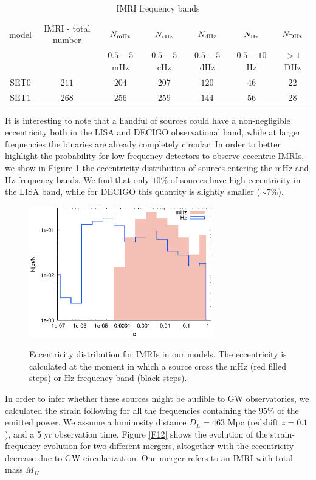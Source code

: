 \documentclass[useAMS,usenatbib]{mn2e}
\begin{document}
 \begin{table}
     \centering
     \caption{IMRI frequency bands}
     \begin{tabular}{ccccccc}
        \hline
        \hline
        model & IMRI - total number & $N_{\rm mHz}$ & $N_{\rm cHz}$ & $N_{\rm dHz}$ & $N_{\rm Hz}$ & $N_{\rm DHz}$ \\ 
              &                     &$0.5-5$ mHz    & $ 0.5-5$ cHz  &  $0.5-5$ dHz & $0.5-10$ Hz & $>1$ DHz \\
        \hline
        SET0 & $211$ & $204$ &  $207$ & $120$ & $46$ & $22$   \\
        SET1 & $268$ & $256$ &  $259$ & $144$ & $56$ & $28$   \\
        \hline
     \end{tabular}
     \label{tab:t4}
 \end{table}
 
 
It is interesting to note that a handful of sources could have a non-negligible eccentricity both in the LISA and DECIGO observational band, while at larger frequencies the binaries are already completely circular. In order to better highlight the probability for low-frequency detectors to observe eccentric IMRIs, we show in Figure \ref{F11} the eccentricity distribution of sources entering the mHz and Hz frequency bands. We find that only $10\%$ of sources have high eccentricity in the LISA band, while for DECIGO this quantity is slightly smaller ($\sim 7\%$).
 
\begin{figure}
\centering
\includegraphics[width=8cm]{mergers_eccen}\\
\caption{Eccentricity distribution for IMRIs in our models. The eccentricity is calculated at the moment in which a source cross the mHz (red filled steps) or Hz frequency band (black steps).}
\label{F11}
\end{figure}

In order to infer whether these sources might be audible to GW observatories, we calculated the strain following \cite{kocsis12} for all the frequencies containing the $95\%$ of the emitted power. We assume a luminosity distance $D_L = 463$ Mpc (redshift $z=0.1$), and a 5 yr observation time. Figure \ref{F12} shows the evolution of the strain-frequency evolution for two different mergers, altogether with the eccentricity decrease due to GW circularization. One merger refers to an IMRI with total mass $M_H$
\end{document}
